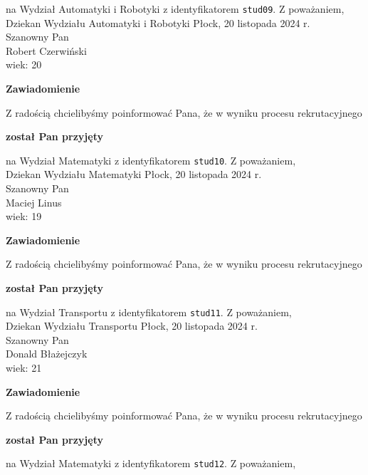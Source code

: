 \documentclass[12pt,a4paper]{article}
\begin{document}
na Wydział Automatyki i Robotyki z identyfikatorem \verb|stud09|. 
\vspace{2cm}
\noindent
Z poważaniem,\\
Dziekan
Wydziału Automatyki i Robotyki
\newpage
\hfill Płock, 20 listopada 2024 r.\\
\noindent 
Szanowny Pan \\
Robert Czerwiński \\
wiek: 20
\bigskip
\begin{center}
 	{\Large\textbf{Zawiadomienie}}
\end{center}
\bigskip
Z radością chcielibyśmy poinformować Pana, że w wyniku procesu rekrutacyjnego 
\begin{center}
\textsf{\textbf{został Pan przyjęty}} 
\end{center}
na Wydział Matematyki z identyfikatorem \verb|stud10|. 
\vspace{2cm}
\noindent
Z poważaniem,\\
Dziekan
Wydziału Matematyki
\newpage
\hfill Płock, 20 listopada 2024 r.\\
\noindent 
Szanowny Pan \\
Maciej Linus \\
wiek: 19
\bigskip
\begin{center}
 	{\Large\textbf{Zawiadomienie}}
\end{center}
\bigskip
Z radością chcielibyśmy poinformować Pana, że w wyniku procesu rekrutacyjnego 
\begin{center}
\textsf{\textbf{został Pan przyjęty}} 
\end{center}
na Wydział Transportu z identyfikatorem \verb|stud11|. 
\vspace{2cm}
\noindent
Z poważaniem,\\
Dziekan
Wydziału Transportu
\newpage
\hfill Płock, 20 listopada 2024 r.\\
\noindent 
Szanowny Pan \\
Donald Błażejczyk \\
wiek: 21
\bigskip
\begin{center}
 	{\Large\textbf{Zawiadomienie}}
\end{center}
\bigskip
Z radością chcielibyśmy poinformować Pana, że w wyniku procesu rekrutacyjnego 
\begin{center}
\textsf{\textbf{został Pan przyjęty}} 
\end{center}
na Wydział Matematyki z identyfikatorem \verb|stud12|. 
\vspace{2cm}
\noindent
Z poważaniem,\\
\end{document}
